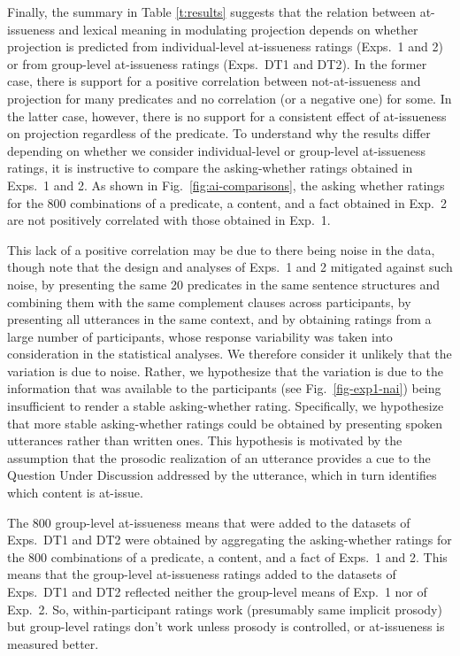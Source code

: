 \documentclass[11pt,fleqn]{article}
\newcommand{\6}{\mbox{$[\hspace*{-.6mm}[$}}
\newcommand{\9}{\mbox{$]\hspace*{-.6mm}]$}}
\begin{document}
Finally, the summary in Table \ref{t:results} suggests that the relation between at-issueness and lexical meaning in modulating projection depends on whether projection is predicted from individual-level at-issueness ratings (Exps.~1 and 2) or from group-level at-issueness ratings (Exps.~DT1 and DT2). In the former case, there is support for a positive correlation between not-at-issueness and projection for many predicates and no correlation (or a negative one) for some. In the latter case, however, there is no support for a consistent effect of at-issueness on projection regardless of the predicate. To understand why the results differ depending on whether we consider individual-level or group-level at-issueness ratings, it is instructive to compare the asking-whether ratings obtained in Exps.~1 and 2. As shown in Fig.~\ref{fig:ai-comparisons}, the asking whether ratings for the 800 combinations of a predicate, a content, and a fact obtained in Exp.~2 are not positively correlated with those obtained in Exp.~1.

This lack of a positive correlation may be due to there being noise in the data, though note that the design and analyses of Exps.~1 and 2 mitigated against such noise, by presenting the same 20 predicates in the same sentence structures and combining them with the same complement clauses across participants, by presenting all utterances in the same context, and by obtaining ratings from a large number of participants, whose response variability was taken into consideration in the statistical analyses. We therefore consider it unlikely that the variation is due to noise. Rather, we hypothesize that the variation is due to the information that was available to the participants (see Fig.~\ref{fig-exp1-nai}) being insufficient to render a stable asking-whether rating. Specifically, we hypothesize that more stable asking-whether ratings could be obtained by presenting spoken utterances rather than written ones. This hypothesis is motivated by the assumption that the prosodic realization of an utterance provides a cue to the Question Under Discussion addressed by the utterance, which in turn identifies which content is at-issue.

The 800 group-level at-issueness means that were added to the datasets of Exps.~DT1 and DT2 were obtained by aggregating the asking-whether ratings for the 800 combinations of a predicate, a content, and a fact of Exps.~1 and 2. This means that the group-level at-issueness ratings added to the datasets of Exps.~DT1 and DT2 reflected neither the group-level means of Exp.~1 nor of Exp.~2. So, within-participant ratings work (presumably same implicit prosody) but group-level ratings don't work unless prosody is controlled, or at-issueness is measured better.
\end{document}
